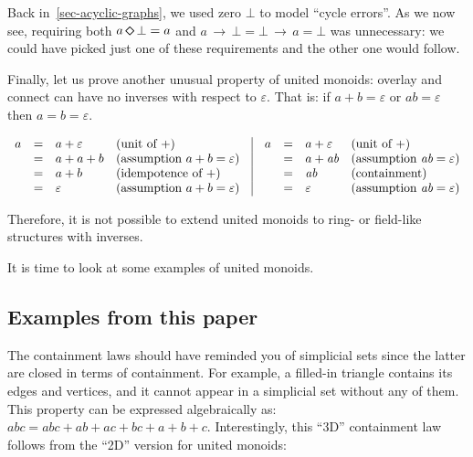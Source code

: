 \documentclass[english,submission]{programming}
\newcommand{\dia}{\,\text{\raisebox{-0.3mm}{\Large $\diamond$}}\,}
\newcommand{\arr}{\,\text{$\rightarrow$}\,}
\begin{document}
\noindent
Back in~\ref{sec-acyclic-graphs}, we used zero $\bot$ to model ``cycle errors''.
As we now see, requiring both $a \dia \bot = a$ and
$a \arr \bot = \bot \arr a = \bot$ was unnecessary: we could have picked just
one of these requirements and the other one would follow.

\noindent
Finally, let us prove another unusual property of united monoids: overlay and
connect can have no inverses with respect to $\varepsilon$. That is: if
$a + b = \varepsilon$ or $\textit{ab} = \varepsilon$ then $a = b = \varepsilon$.

\vspace{-5mm}
\begin{equation*}
\begin{array}{rcllcrcll}
a & = & a + \varepsilon & \text{(unit of $+$)} & \vrule & a & = & a + \varepsilon & \text{(unit of $+$)}\\
 & = & a + a + b & \text{(assumption $a + b = \varepsilon$)}& \vrule &  & = & a + \textit{ab} & \text{(assumption $\textit{ab} = \varepsilon$)} \\
 & = & a + b & \text{(idempotence of $+$)}& \vrule & & = & \textit{ab} & \text{(containment)} \\
 & = & \varepsilon & \text{(assumption $a + b = \varepsilon$)}& \vrule & & = & \varepsilon & \text{(assumption $\textit{ab} = \varepsilon$)}
\end{array}
\end{equation*}
\vspace{-3mm}

\noindent
Therefore, it is not possible to extend united monoids to ring- or field-like
structures with inverses.

It is time to look at some examples of united monoids.

\subsection{Examples from this paper}

The containment laws should have reminded you of simplicial sets since the
latter are closed in terms of containment. For example, a filled-in triangle
contains its edges and vertices, and it cannot appear in a simplicial set
without any of them. This property can be expressed algebraically as:
$\textit{abc} = \textit{abc} + \textit{ab} + \textit{ac} + \textit{bc} + a + b + c$.
Interestingly, this ``3D'' containment law follows from the ``2D'' version for
united monoids:
\end{document}
